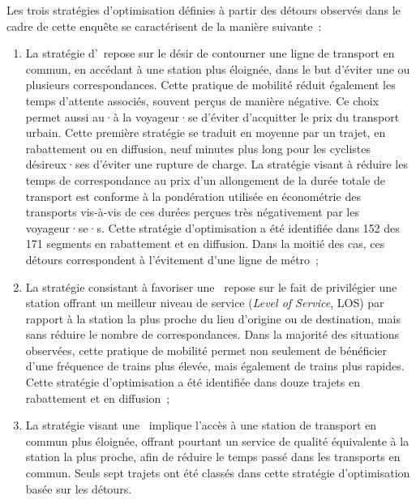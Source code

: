 \begin{refsegment}
Les trois stratégies d'optimisation définies à partir des détours observés dans le cadre de cette enquête se caractérisent de la manière suivante~:
\begin{enumerate}
    \item La stratégie d'~repose sur le désir de contourner une ligne de transport en commun, en accédant à une station plus éloignée, dans le but d'éviter une ou plusieurs correspondances. Cette pratique de mobilité réduit également les temps d'attente associés, souvent perçus de manière négative. Ce choix permet aussi au·à la voyageur·se d'éviter d'acquitter le prix du transport urbain. Cette première stratégie se traduit en moyenne par un trajet, en rabattement ou en diffusion, neuf minutes plus long pour les cyclistes désireux·ses d'éviter une rupture de charge. La stratégie visant à réduire les temps de correspondance au prix d'un allongement de la durée totale de transport est conforme à la pondération utilisée en économétrie des transports vis-à-vis de ces durées perçues très négativement par les voyageur·se·s. Cette stratégie d'optimisation a été identifiée dans 152 des 171 segments en rabattement et en diffusion. Dans la moitié des cas, ces détours correspondent à l'évitement d'une ligne de métro~;
    \item La stratégie consistant à favoriser une ~repose sur le fait de privilégier une station offrant un meilleur niveau de service (\textsl{Level of Service}, LOS) par rapport à la station la plus proche du lieu d'origine ou de destination, mais sans réduire le nombre de correspondances. Dans la majorité des situations observées, cette pratique de mobilité permet non seulement de bénéficier d'une fréquence de trains plus élevée, mais également de trains plus rapides. Cette stratégie d'optimisation a été identifiée dans douze trajets en rabattement et en diffusion~;
    \item La stratégie visant une ~implique l'accès à une station de transport en commun plus éloignée, offrant pourtant un service de qualité équivalente à la station la plus proche, afin de réduire le temps passé dans les transports en commun. Seuls sept trajets ont été classés dans cette stratégie d'optimisation basée sur les détours.
\end{enumerate}%


\end{refsegment}

